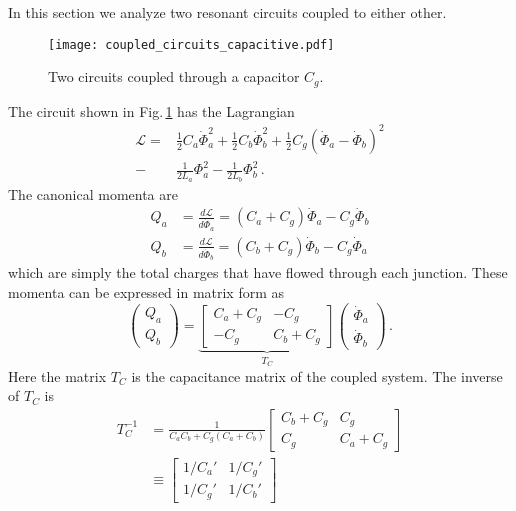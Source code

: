 
In this section we analyze two resonant circuits coupled to either other.


\begin{figure}
\begin{centering}
\texttt{[image: coupled\_circuits\_capacitive.pdf]}
\par\end{centering}
\caption{Two circuits coupled through a capacitor $C_g$.}
\label{Fig:coupledCircuits_capacitive}
\end{figure}

The circuit shown in Fig.\,\ref{Fig:coupledCircuits_capacitive} has the Lagrangian
\begin{align}
  \mathcal{L}
  =& \frac{1}{2}C_a\dot{\Phi}_a^2 + \frac{1}{2}C_b\dot{\Phi}_b^2
   + \frac{1}{2}C_g \left( \dot{\Phi}_a - \dot{\Phi}_b \right)^2 \nonumber \\
  -& \frac{1}{2L_a}\Phi_a^2 - \frac{1}{2L_b}\Phi_b^2 \, .
\end{align}
The canonical momenta are
\begin{align}
  Q_a &= \frac{d \mathcal{L}}{d\dot{\Phi}_a} = (C_a + C_g) \dot{\Phi}_a - C_g\dot{\Phi}_b \nonumber \\
  Q_b &= \frac{d \mathcal{L}}{d\dot{\Phi}_b} = (C_b + C_g) \dot{\Phi}_b - C_g\dot{\Phi}_a
\end{align}
which are simply the total charges that have flowed through each junction.
These momenta can be expressed in matrix form as
\begin{equation*}
  \left( \begin{array}{c} Q_a \\ Q_b \end{array} \right) =
  \underbrace{
    \left[ \begin{array}{cc} C_a + C_g & -C_g \\ -C_g & C_b + C_g \end{array} \right]}_{T_C}
  \left( \begin{array}{c} \dot{\Phi}_a \\ \dot{\Phi}_b \end{array} \right)
  \, .
\end{equation*}
Here the matrix $T_C$ is the capacitance matrix of the coupled system.
The inverse of $T_C$ is
\begin{align}
  T_C^{-1}
  &= \frac{1}{C_a C_b + C_g (C_a + C_b)}
    \left[ \begin{array}{cc} C_b + C_g & C_g \\ C_g & C_a + C_g \end{array} \right] \nonumber \\
  &\equiv \left[
    \begin{array}{cc} 1/C_a' & 1/C_g' \\ 1/C_g' & 1/C_b' \end{array}
    \right]
\end{align}
